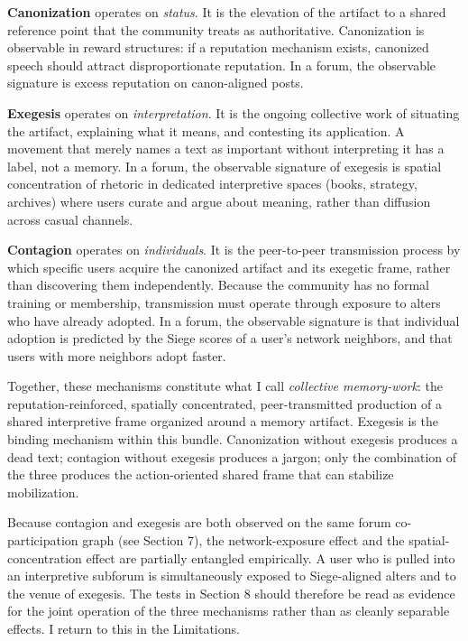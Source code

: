 \documentclass[bibtex,autowc,nonblind]{apsr_submission}
\begin{document}
\textbf{Canonization} operates on \textit{status}. It is the elevation of the artifact to a shared reference point that the community treats as authoritative. Canonization is observable in reward structures: if a reputation mechanism exists, canonized speech should attract disproportionate reputation. In a forum, the observable signature is excess reputation on canon-aligned posts.

\textbf{Exegesis} operates on \textit{interpretation}. It is the ongoing collective work of situating the artifact, explaining what it means, and contesting its application. A movement that merely names a text as important without interpreting it has a label, not a memory. In a forum, the observable signature of exegesis is spatial concentration of rhetoric in dedicated interpretive spaces (books, strategy, archives) where users curate and argue about meaning, rather than diffusion across casual channels.

\textbf{Contagion} operates on \textit{individuals}. It is the peer-to-peer transmission process by which specific users acquire the canonized artifact and its exegetic frame, rather than discovering them independently. Because the community has no formal training or membership, transmission must operate through exposure to alters who have already adopted. In a forum, the observable signature is that individual adoption is predicted by the Siege scores of a user's network neighbors, and that users with more neighbors adopt faster.

Together, these mechanisms constitute what I call \textit{collective memory-work}: the reputation-reinforced, spatially concentrated, peer-transmitted production of a shared interpretive frame organized around a memory artifact. Exegesis is the binding mechanism within this bundle. Canonization without exegesis produces a dead text; contagion without exegesis produces a jargon; only the combination of the three produces the action-oriented shared frame that can stabilize mobilization.

Because contagion and exegesis are both observed on the same forum co-participation graph (see Section 7), the network-exposure effect and the spatial-concentration effect are partially entangled empirically. A user who is pulled into an interpretive subforum is simultaneously exposed to Siege-aligned alters and to the venue of exegesis. The tests in Section 8 should therefore be read as evidence for the joint operation of the three mechanisms rather than as cleanly separable effects. I return to this in the Limitations.
\end{document}
